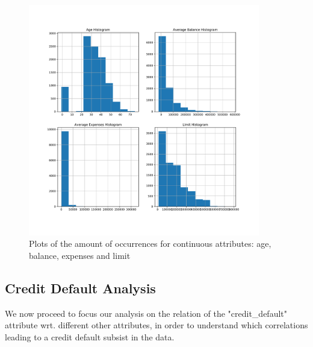\documentclass[a4paper]{article}
\begin{document}
\begin{enumerate}
\begin{center}
\begin{figure}

\includegraphics[width=0.9\textwidth]{../Code/Daniele/Plots/age_balance_expenses_limit_hist.pdf}
\caption{Plots of the amount of occurrences for continuous attributes: age, balance, expenses and limit}
\label{hist_continuous_attributes}
\end{figure}
\end{center}
	
\end{enumerate}



\subsection{Credit Default Analysis}

We now proceed to focus our analysis on the relation of the "credit\_default" attribute wrt. different other attributes, in order to understand which correlations leading to a credit default subsist in the data. 
\end{document}
